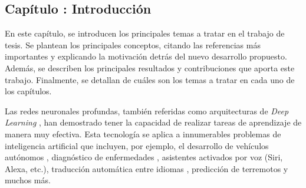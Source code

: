 \documentclass[spanish]{article}
\theoremstyle{definition}
\theoremstyle{remark}
\numberwithin{equation}{section}
\numberwithin{equation}{section} %
\begin{document}
    
\clearpage
    \renewcommand*\contentsname{Índice general}
  \tableofcontents  %

\cleardoublepage
    \renewcommand{\listfigurename}{Lista de figuras}
    \listoffigures %

\cleardoublepage
{} %
    \renewcommand{\listtablename}{Lista de tablas}
        \renewcommand{\tablename}{Tabla}

\listoftables %
  
\clearpage
  \thispagestyle{fancy} %



\clearpage
\vspace*{0.25in}
\begin{center}
\begin{LARGE}
 \section{Capítulo \thesection: Introducción}
\end{LARGE}
\end{center}

\vspace*{0.25in}
\normalsize En este capítulo, se introducen los principales temas a tratar en el trabajo de tesis. Se plantean los principales conceptos, citando las referencias más importantes y explicando la motivación detrás del nuevo desarrollo propuesto. Además, se describen los principales resultados y contribuciones que aporta este trabajo. Finalmente, se detallan de cuáles son los temas a tratar en cada uno de los capítulos.

\par



\clearpage

Las redes neuronales profundas, también referidas como arquitecturas de \textit{Deep Learning} \cite{goodfellow2016deep}, han demostrado tener la capacidad de realizar tareas de aprendizaje de manera muy efectiva. Esta tecnología se aplica a innumerables problemas de inteligencia artificial que incluyen, por ejemplo, el desarrollo de vehículos autónomos \cite{bojarski2016end}, diagnóstico de enfermedades \cite{fakoor2013using}, asistentes activados por voz (Siri, Alexa, etc.), traducción automática entre idiomas \cite{luong2014addressing,bahdanau2014neural}, predicción de terremotos \cite{devries2018deep} y muchos más. \par
\end{document}
